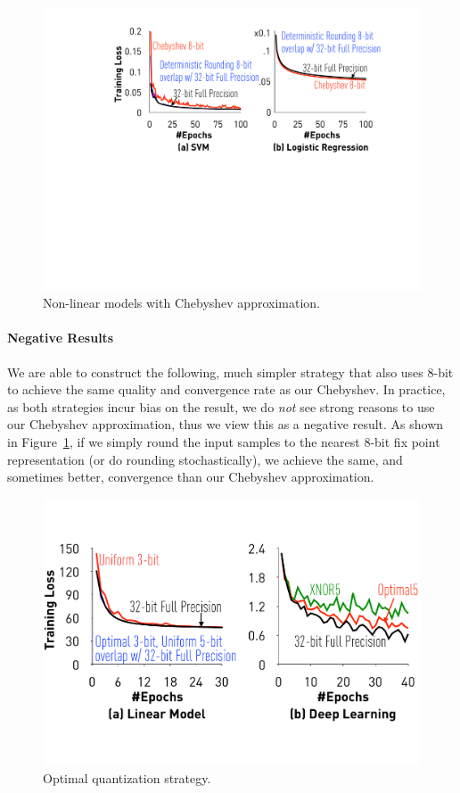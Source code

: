 \documentclass{article}
\begin{document}
\begin{figure}[t]
\centering
\includegraphics[width=0.7\columnwidth]{final-experiments/chebyshev} 
\vspace{-1em}
\caption{Non-linear models with Chebyshev approximation.}
\label{fig:chebyshev}
\end{figure}

\vspace{-0.5em}
\paragraph{Negative Results}

We are able to construct the following,
much simpler strategy that also
uses 8-bit to achieve the same quality
and convergence rate as our
Chebyshev. In practice, as both
strategies incur bias on the result,
we do {\em not} see strong reasons to
use our Chebyshev approximation, thus
we view this as a negative result.
As shown in Figure~\ref{fig:chebyshev},
if we simply round the input samples
to the nearest 8-bit fix point
representation (or do rounding
stochastically), we achieve the
same, and sometimes better,
convergence than our Chebyshev 
approximation.

\begin{figure}[t]
\centering
\includegraphics[width=0.7\columnwidth]{final-experiments/optimal} 
\vspace{-1em}
\caption{Optimal quantization strategy.}
\label{fig:optimal}
\end{figure}
\end{document}
